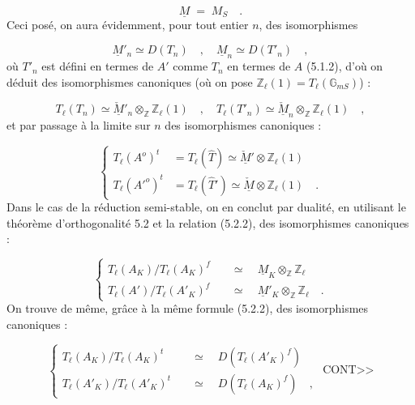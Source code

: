 \begin{equation*}
\underline{M} \;=\; M_S \quad .
\end{equation*}
Ceci posé, on aura évidemment, pour tout entier $n$, des isomorphismes

\begin{equation}\tag{5.5.5}
\underline{M}'_n \simeq D(T_n) \quad , \quad \underline{M}_n \simeq D(T'_n) \quad ,
\end{equation}
où $T'_n$ est défini en termes de $A'$ comme $T_n$ en termes de $A$ (5.1.2), d'où on déduit des isomorphismes canoniques (où on pose $\mathbb{Z}_\ell(1) = T_\ell(\mathbb{G}_{mS})$) :

\begin{equation}\tag{5.5.6}
T_\ell(T_n) \simeq \check{\underline{M}}'_n \otimes_{\mathbb{Z}} \mathbb{Z}_\ell(1) \quad , \quad T_\ell(T'_n) \simeq \check{\underline{M}}_n \otimes_{\mathbb{Z}} \mathbb{Z}_\ell(1) \quad ,
\end{equation}
et par passage à la limite sur $n$ des isomorphismes canoniques :

\begin{equation}\tag{5.5.7}
\left\{\begin{aligned} T_\ell(A^o)^t &= T_\ell(\hat{T}) \simeq \check{\underline{M}}' \otimes \mathbb{Z}_\ell(1)\\[2ex] T_\ell({A'}^o)^t &= T_\ell(\hat{T}') \simeq \check{\underline{M}} \otimes \mathbb{Z}_\ell(1) \quad . \end{aligned}\right.
\end{equation}
Dans le cas de la réduction semi-stable, on en conclut par dualité, en utilisant le théorème d'orthogonalité 5.2 et la relation (5.2.2), des isomorphismes canoniques :

\begin{equation}\tag{5.5.8}
\left\{\begin{aligned} T_\ell(A_K)/T_\ell(A_K)^f \quad &\simeq \quad \underline{M}_K \otimes_{\mathbb{Z}} \mathbb{Z}_\ell\\[2ex] T_\ell(A')/T_\ell(A'_K)^f \quad &\simeq \quad \underline{M}'_K \otimes_{\mathbb{Z}} \mathbb{Z}_\ell \quad . \end{aligned}\right.
\end{equation}
On trouve de même, grâce à la même formule (5.2.2), des isomorphismes canoniques :

\begin{equation}\tag{5.5.9}
\left\{\begin{aligned} T_\ell(A_K)/T_\ell(A_K)^t \quad &\simeq \quad D(T_\ell(A'_K)^f)\\[2ex] T_\ell(A'_K)/T_\ell(A'_K)^t \quad &\simeq \quad D(T_\ell(A_K)^f) \quad , \end{aligned}\right. \text{ CONT>>}
\end{equation}

